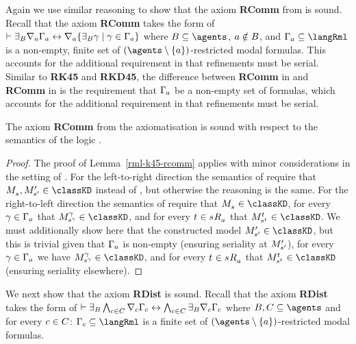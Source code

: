 Again we use similar reasoning to show that the axiom {\bf RComm} from \axiomRmlKD{} is sound.
Recall that the axiom {\bf RComm} takes the form of $\vdash {\exists_{B}} \nabla_{a} \Gamma_a \leftrightarrow \nabla_{a} \{{\exists_{B}} \gamma \mid \gamma \in \Gamma_a\}$ where $\agentsB \subseteq \agents$, $a \notin B$, and $\Gamma_\agentA \subseteq \langRml$ is a non-empty, finite set of $(\agents \setminus \{\agentA\})$-restricted modal formulas.
This accounts for the additional requirement in \logicRmlKD{} that refinements must be serial.
Similar to {\bf RK45} and {\bf RKD45}, the difference between {\bf RComm} in \axiomRmlKFF{} and {\bf RComm} in \axiomRmlKD{} is the requirement that $\Gamma_a$ be a non-empty set of formulas, which accounts for the additional requirement in \logicRmlKD{} that refinements must be serial.

\begin{lemma}\label{rml-kd45-rcomm}
The axiom {\bf RComm} from the axiomatisation \axiomRmlKD{} is sound with respect to the semantics of the logic \logicRmlKD{}.
\end{lemma}

\begin{proof}
The proof of Lemma~\ref{rml-k45-rcomm} applies with minor considerations in the setting of \logicRmlKD{}.
For the left-to-right direction the semantics of \logicRmlKD{} require that $\kPModel{\kStateS}, \kPModelP{\kStateSP} \in \classKD$ instead of \classKFF{}, but otherwise the reasoning is the same.
For the right-to-left direction the semantics of \logicRmlKD{} require that $\kPModel{\kStateS} \in \classKD$, for every $\gamma \in \Gamma_a$ that $\kPModel[\gamma]{\kStateS[\gamma]} \in \classKD$, and for every $\kStateT \in \kSuccessorsA{\kStateS}$ that $\kPModel[\kStateT]{\kStateS[\kStateT]} \in \classKD$.
We must additionally show here that the constructed model $\kPModelP{\kStateSP} \in \classKD$, but this is trivial given that $\Gamma_a$ is non-empty (ensuring seriality at ${M^{\prime}_{{s}^{\prime}}}$), for every $\gamma \in \Gamma_a$ we have $\kPModel[\gamma]{\kStateS[\gamma]} \in \classKD$, and for every $\kStateT \in \kSuccessorsA{\kStateS}$ that $\kPModel[\kStateT]{\kStateS[\kStateT]} \in \classKD$ (ensuring seriality elsewhere).
\end{proof}

We next show that the axiom {\bf RDist} is sound.
Recall that the axiom {\bf RDist} takes the form of $\vdash {\exists_{B}} \bigwedge_{c \in C} \nabla_{c} \Gamma_c \leftrightarrow \bigwedge_{c \in C} {\exists_{B}} \nabla_{c} \Gamma_c$ where $\agentsB, \agentsC \subseteq \agents$ and for every $c \in C$: $\Gamma_\agentC \subseteq \langRml$ is a finite set of $(\agents \setminus \{\agentA\})$-restricted modal formulas.

